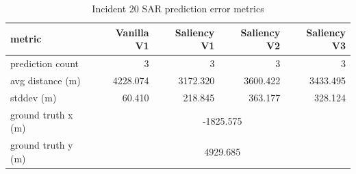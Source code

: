 \begin{table}[ht]
\centering
\caption{Incident 20 SAR prediction error metrics}
\label{tab:sar-incident-20}
\begin{tabular}{lrrrr}
\hline
metric & Vanilla V1 & Saliency V1 & Saliency V2 & Saliency V3 \\
\hline
prediction count & 3 & 3 & 3 & 3 \\
avg distance (m) & 4228.074 & 3172.320 & 3600.422 & 3433.495 \\
stddev (m) & 60.410 & 218.845 & 363.177 & 328.124 \\
ground truth x (m) & \multicolumn{4}{c}{-1825.575} \\
ground truth y (m) & \multicolumn{4}{c}{4929.685} \\
\hline
\end{tabular}
\end{table}
